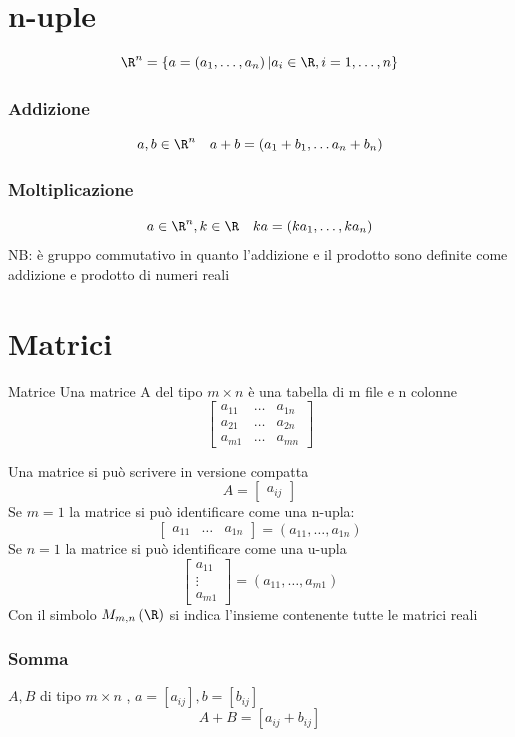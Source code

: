 \section{n-uple}
\[
	\R ^{n}= \left\{ a= \left( a_1, \ldots, a_n \right) | a_i  \in \R, i=1, \ldots , n \right\}
\]
\subsubsection*{Addizione}
\[
	a,b  \in  \R ^{n} \quad a+b = \left( a_1 + b_1 , \ldots a_n + b_n \right)
\]
\subsubsection*{Moltiplicazione}
\[
	a  \in  \R ^{n}, k  \in  \R \quad ka= \left( ka_1, \ldots, ka_n \right)
\]
NB: è gruppo commutativo in quanto l'addizione e il prodotto sono definite come addizione e prodotto di numeri reali

\section{Matrici}

\begin{definizione}{Matrice}
	Una matrice A del tipo $m \times n$ è una tabella di m file e n colonne
	\[
		\begin{bmatrix}
			a_{11} & \ldots & a_{1n} \\
			a_{21} & \ldots & a_{2n} \\
			a_{m1} & \ldots & a_{mn}
		\end{bmatrix}
	\]
\end{definizione}
Una matrice si può scrivere in versione compatta
\[
	A= \begin{bmatrix} a_{ij} \end{bmatrix}
\]
Se $m=1$ la matrice si può identificare come una n-upla:
\[
	\begin{bmatrix}
		a_{11} & \ldots & a_{1n}
	\end{bmatrix}
	=
	\left( 	a_{11},  \ldots, a_{1n} \right)
\]
Se $ n=1$ la matrice si può identificare come una u-upla
\[
	\begin{bmatrix}
		a_{11} \\ \vdots \\ a_{m1}
	\end{bmatrix}
	=
	\left( 	a_{11},  \ldots, a_{m1} \right)
\]
Con il simbolo $M_{m,n}\left( \R \right) $ si indica l'insieme contenente tutte le matrici reali

\subsubsection*{Somma}
\label{ssub:somma}
$A,B$ di tipo $m \times n$ , $ a = \left[ a_{ij} \right] , b= \left[ b_{ij} \right] $
\[
	A + B = \left[ a_{ij}+ b_{ij} \right]
\]
